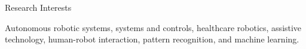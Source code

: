\documentclass{resume} %
\begin{document}
%





\begin{rSection}{Research Interests}

  Autonomous robotic systems, systems and controls, healthcare robotics,
  assistive technology, human-robot interaction, pattern recognition, and
  machine learning.

\end{rSection}





\iffalse
\begin{rSection}{Summary}

\begin{itemize}
\item Extensive experience conducting user studies, including experiment design
  and data analysis.
\item Experience with the Kinect SDK from Microsoft to develop a VR game for the
  rehabilitation of children who have cerebral palsy.
\item Experience developing algorithms to assess the upper-body kinematic
  performance of children who have cerebral palsy. \\
\end{itemize}

\end{rSection}
\fi




\end{document}

